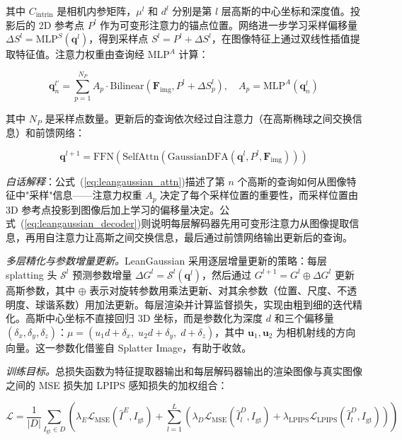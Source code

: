 其中 $C_{\mathrm{intrin}}$ 是相机内参矩阵，$\mu^l$ 和 $d^l$ 分别是第 $l$ 层高斯的中心坐标和深度值。投影后的 2D 参考点 $P^l$ 作为可变形注意力的锚点位置。网络进一步学习采样偏移量 $\Delta S^l = \mathrm{MLP}^S(\mathbf{q}^l)$，得到采样点 $S^l = P^l + \Delta S^l$，在图像特征上通过双线性插值提取特征值。注意力权重由查询经 $\mathrm{MLP}^A$ 计算：

\begin{equation}
\label{eq:leangaussian_attn}
\mathbf{q}_n^{l\prime} = \sum_{p=1}^{N_P} A_p \cdot \mathrm{Bilinear}(\mathbf{F}_{\mathrm{img}}, P^l + \Delta S_p^l), \quad A_p = \mathrm{MLP}^A(\mathbf{q}_n^l)
\end{equation}

其中 $N_P$ 是采样点数量。更新后的查询依次经过自注意力（在高斯椭球之间交换信息）和前馈网络：

\begin{equation}
\label{eq:leangaussian_decoder}
\mathbf{q}^{l+1} = \mathrm{FFN}\!\left(\mathrm{SelfAttn}\!\left(\mathrm{GaussianDFA}(\mathbf{q}^l, P^l, \mathbf{F}_{\mathrm{img}})\right)\right)
\end{equation}

\textit{白话解释}：公式~(\ref{eq:leangaussian_attn})描述了第 $n$ 个高斯的查询如何从图像特征中"采样"信息——注意力权重 $A_p$ 决定了每个采样位置的重要性，而采样位置由 3D 参考点投影到图像后加上学习的偏移量决定。公式~(\ref{eq:leangaussian_decoder})则说明每层解码器先用可变形注意力从图像提取信息，再用自注意力让高斯之间交换信息，最后通过前馈网络输出更新后的查询。

\textit{多层精化与参数增量更新。}\;LeanGaussian 采用逐层增量更新的策略：每层 splatting 头 $\mathcal{S}^l$ 预测参数增量 $\Delta G^l = \mathcal{S}^l(\mathbf{q}^l)$，然后通过 $G^{l+1} = G^l \oplus \Delta G^l$ 更新高斯参数，其中 $\oplus$ 表示对旋转参数用乘法更新、对其余参数（位置、尺度、不透明度、球谐系数）用加法更新。每层渲染并计算监督损失，实现由粗到细的迭代精化。高斯中心坐标不直接回归 3D 坐标，而是参数化为深度 $d$ 和三个偏移量 $(\delta_x, \delta_y, \delta_z)$：$\mu = (u_1 d + \delta_x,\; u_2 d + \delta_y,\; d + \delta_z)$，其中 $\mathbf{u}_1, \mathbf{u}_2$ 为相机射线的方向向量。这一参数化借鉴自 Splatter Image，有助于收敛。

\textit{训练目标。}\;总损失函数为特征提取器输出和每层解码器输出的渲染图像与真实图像之间的 MSE 损失加 LPIPS 感知损失的加权组合：

\begin{equation}
\label{eq:leangaussian_loss}
\mathcal{L} = \frac{1}{|D|}\sum_{I_{\mathrm{gt}} \in D}\left(\lambda_E \mathcal{L}_{\mathrm{MSE}}(\hat{I}^E, I_{\mathrm{gt}}) + \sum_{l=1}^{L}\left(\lambda_D \mathcal{L}_{\mathrm{MSE}}(\hat{I}^D_l, I_{\mathrm{gt}}) + \lambda_{\mathrm{LPIPS}} \mathcal{L}_{\mathrm{LPIPS}}(\hat{I}^D_l, I_{\mathrm{gt}})\right)\right)
\end{equation}


